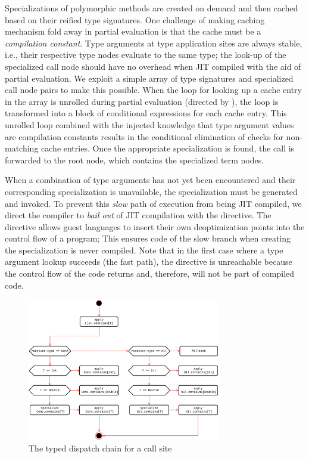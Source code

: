 Specializations of polymorphic methods are created on demand and then cached based on their reified type signatures.
One challenge of making caching mechanism fold away in partial evaluation is that the cache must be a \textit{compilation constant}.
Type arguments at type application sites are always stable, i.e., their respective type nodes evaluate to the same type; the look-up of the specialized call node should have no overhead when JIT compiled with the aid of partial evaluation. 
We exploit a simple array of type signatures and specialized call node pairs to make this possible.
When the loop for looking up a cache entry in the array is unrolled during partial evaluation (directed by ), the loop is transformed into a block of conditional expressions for each cache entry.
This unrolled loop combined with the injected knowledge that type argument values are compilation constants results in the conditional elimination\cite{conditional-elim} of checks for non-matching cache entries.
Once the appropriate specialization is found, the call is forwarded to the root node, which contains the specialized term nodes.

When a combination of type arguments has not yet been encountered and their corresponding specialization is unavailable, the specialization must be generated and invoked.
To prevent this \textit{slow} path of execution from being JIT compiled, we direct the compiler to \textit{bail out} of JIT compilation with the  directive.
The directive allows guest languages to insert their own deoptimization points into the control flow of a program;
This ensures code of the slow branch when creating the specialization is never compiled.
Note that in the first case where a type argument lookup succeeds (the fast path), the directive is unreachable because the control flow of the code returns and, therefore, will not be part of compiled code.

\begin{figure}[!htb]
	\centering
	\includegraphics[width=0.75\textwidth]{figures/tastytruffle-type-dispatch-chain.png}
	\caption{The typed dispatch chain for a  call site}
	\label{example:typed-dispatch}
\end{figure}

